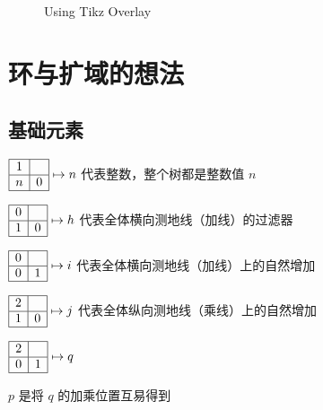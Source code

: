 \documentclass[a4paper,12pt]{article}
\begin{document}
\begin{figure} \centering
{}
\caption{Using Tikz Overlay}
\end{figure}


\newpage

\section{环与扩域的想法}

\subsection{基础元素}

$\begin{array}{|c|c|}\hline 1&\space\\\hline n&0\\\hline\end{array} \mapsto n$ 代表整数，整个树都是整数值 $n$

$\begin{array}{|c|c|}\hline0&\space\\\hline 1&0\\\hline\end{array} \mapsto h$ 代表全体横向测地线（加线）的过滤器

$\begin{array}{|c|c|}\hline0&\space\\\hline 0&1\\\hline\end{array} \mapsto i$ 代表全体横向测地线（加线）上的自然增加

$\begin{array}{|c|c|}\hline2&\space\\\hline 1&0\\\hline\end{array} \mapsto j$ 代表全体纵向测地线（乘线）上的自然增加

$\begin{array}{|c|c|}\hline2&\space\\\hline 0&1\\\hline\end{array} \mapsto q$

$p$ 是将 $q$ 的加乘位置互易得到
\end{document}
